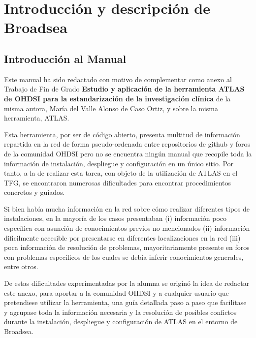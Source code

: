 \chapter{Introducción y descripción de Broadsea} \label{cap:01Introduccion}

\section{Introducción al Manual} \label{sec:01IntroManual}

Este manual ha sido redactado con motivo de complementar como anexo al Trabajo de Fin de Grado \textbf{Estudio y aplicación de la herramienta ATLAS de OHDSI para la estandarización de la investigación clínica}
de la misma autora, María del Valle Alonso de Caso Ortiz, y sobre la misma herramienta, ATLAS.


Esta herramienta, por ser de código abierto, presenta multitud de información repartida en la red de forma pseudo-ordenada entre repositorios de github y foros de la comunidad OHDSI pero no se encuentra ningún manual que recopile toda la información de instalación,  despliegue y configuración en un único sitio. Por tanto, a la de realizar esta tarea, con objeto de la utilización de ATLAS en el TFG, se encontraron numerosas dificultades para encontrar procedimientos concretos y guiados.

Si bien había mucha información en la red sobre cómo realizar diferentes tipos de instalaciones, en la mayoría de los casos presentaban (i) información poco específica con asunción de conocimientos previos no mencionados (ii) información dificilmente accesible por presentarse en diferentes localizaciones en la red (iii) poca información de resolución de problemas, mayoritariamente presente en foros con problemas específicos de los cuales se debía inferir conocimientos generales, entre otros.  

De estas dificultades experimentadas por la alumna se originó la idea de redactar este anexo, para aportar a la comunidad OHDSI y a cualquier usuario que pretendiese utilizar la herramienta, una guía detallada paso a paso que facilitase y agrupase toda la información necesaria y la resolución de posibles confictos durante la instalación, despliegue y configuración de ATLAS en el entorno de Broadsea. 

